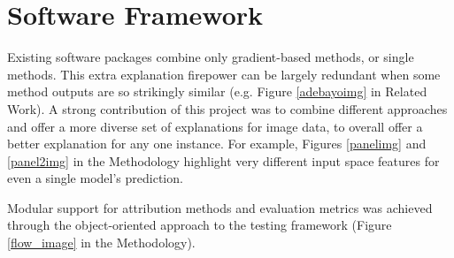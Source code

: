 \documentclass[main]{subfiles}
\begin{document}
\section{Software Framework}

Existing software packages combine only gradient-based methods, or single methods. This extra explanation firepower can be largely redundant when some method outputs are so strikingly similar (e.g. Figure \ref{adebayoimg} in Related Work). A strong contribution of this project was to combine different approaches and offer a more diverse set of explanations for image data, to overall offer a better explanation for any one instance. For example, Figures \ref{panelimg} and \ref{panel2img} in the Methodology highlight very different input space features for even a single model's prediction.

Modular support for attribution methods and evaluation metrics was achieved through the object-oriented approach to the testing framework (Figure \ref{flow_image} in the Methodology).


\end{document}
